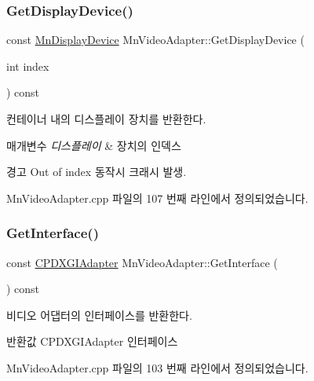 \subsubsection{\texorpdfstring{Get\+Display\+Device()}{GetDisplayDevice()}}
{\footnotesize\ttfamily const \hyperlink{class_m_n_l_1_1_mn_display_device}{Mn\+Display\+Device} Mn\+Video\+Adapter\+::\+Get\+Display\+Device (\begin{DoxyParamCaption}\item[{int}]{index }\end{DoxyParamCaption}) const}



컨테이너 내의 디스플레이 장치를 반환한다. 


\begin{DoxyParams}{매개변수}
{\em 디스플레이} & 장치의 인덱스 \\
\hline
\end{DoxyParams}
\begin{DoxyWarning}{경고}
Out of index 동작시 크래시 발생. 
\end{DoxyWarning}


Mn\+Video\+Adapter.\+cpp 파일의 107 번째 라인에서 정의되었습니다.

\mbox{\label{class_m_n_l_1_1_mn_video_adapter_a00045e64751e6804e2901ed6bdf49e40}} 
\subsubsection{\texorpdfstring{Get\+Interface()}{GetInterface()}}
{\footnotesize\ttfamily const \hyperlink{namespace_m_n_l_ab0e24805043a50c45364c389f8929f33}{C\+P\+D\+X\+G\+I\+Adapter} Mn\+Video\+Adapter\+::\+Get\+Interface (\begin{DoxyParamCaption}{ }\end{DoxyParamCaption}) const}



비디오 어댑터의 인터페이스를 반환한다. 

\begin{DoxyReturn}{반환값}
C\+P\+D\+X\+G\+I\+Adapter 인터페이스 
\end{DoxyReturn}


Mn\+Video\+Adapter.\+cpp 파일의 103 번째 라인에서 정의되었습니다.

